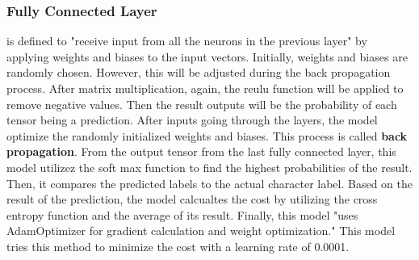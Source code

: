 \subsubsection{Fully Connected Layer}
is defined to "receive input from all the neurons in the previous layer"\cite{sachan_2017} by applying
weights and biases to the input vectors. Initially, weights and biases are randomly chosen. However, this
will be adjusted during the back propagation process. After matrix multiplication, again, the reulu function
will be applied to remove negative values. Then the result outputs will be the probability of each tensor being
a prediction.
\newline
\newline
\indent
After inputs going through the layers, the model optimize the randomly initialized weights and biases. This process is called
\textbf{back propagation}.
From the output tensor from the last fully connected layer, this model utilizez the soft max function to find
the highest probabilities of the result. Then, it compares the predicted labels to the actual character label.
Based on the result of the prediction, the model calcualtes the cost by utilizing the cross entropy function and the
average of its result. Finally, this model "uses AdamOptimizer for gradient calculation and weight optimization."\cite{sachan_2017}
This model tries this method to minimize the cost with a learning rate of 0.0001.

